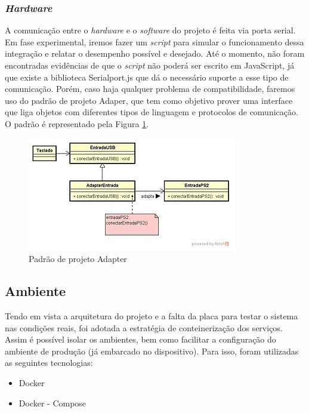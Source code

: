 \subsubsection{\textit{Hardware}}

\par A comunicação entre o \textit{hardware} e o \textit{software} do projeto é feita via porta serial. Em fase experimental, iremos fazer um \textit{script} para simular o funcionamento dessa integração e relatar o desempenho possível e desejado. Até o momento, não foram encontradas evidências de que o \textit{script} não poderá ser escrito em JavaScript, já que existe a biblioteca Serialport.js \cite{serialport} que dá o necessário suporte a esse tipo de comunicação. Porém, caso haja qualquer problema de compatibilidade, faremos uso do padrão de projeto Adaper, que tem como objetivo prover uma interface que liga objetos com diferentes tipos de linguagem e protocolos de comunicação. O padrão é representado pela Figura \ref{fig:adapter}.

\begin{figure}[!h]
	\centering
	\label{adapter}
		\includegraphics[keepaspectratio=true,scale=1]{figuras/adapter.jpg}
	\caption{Padrão de projeto Adapter \cite{Adapter}}
	\label{fig:adapter}
\end{figure}

\subsection{Ambiente}

\par Tendo em vista a arquitetura do projeto e a falta da placa para testar o sistema nas condições reais, foi adotada a estratégia de conteinerização dos serviços. Assim é possível isolar os ambientes, bem como facilitar a configuração do ambiente de produção (já embarcado no dispositivo). Para isso, foram utilizadas as seguintes tecnologias:

\begin{itemize}
    \item Docker \cite{docker}
    \item Docker - Compose \cite{docker-compose}
\end{itemize}

